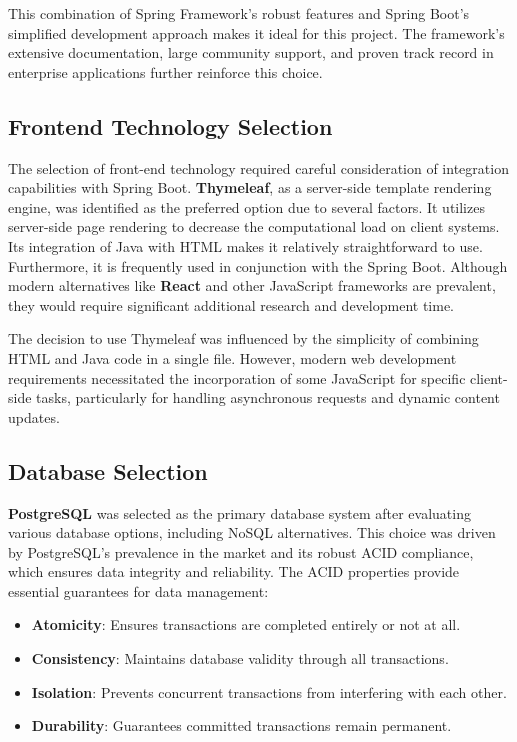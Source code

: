 This combination of Spring Framework's robust features and Spring Boot's simplified development approach makes it ideal for this project.
The framework's extensive documentation, large community support, and proven track record in enterprise applications further reinforce this choice.

\subsection{Frontend Technology Selection}\label{subsec:frontend-selection}

The selection of front-end technology required careful consideration of integration capabilities with Spring Boot.
\textbf{Thymeleaf}, as a server-side template rendering engine, was identified as the preferred option due to several factors.
It utilizes server-side page rendering to decrease the computational load on client systems.
Its integration of Java with HTML makes it relatively straightforward to use.
Furthermore, it is frequently used in conjunction with the Spring Boot.
Although modern alternatives like \textbf{React} and other JavaScript frameworks are prevalent, they would require significant additional research and development time.

The decision to use Thymeleaf was influenced by the simplicity of combining HTML and Java code in a single file.
However, modern web development requirements necessitated the incorporation of some JavaScript for specific client-side tasks, particularly for handling asynchronous requests and dynamic content updates.

\subsection{Database Selection}\label{subsec:database-selection}

\textbf{PostgreSQL} was selected as the primary database system after evaluating various database options, including NoSQL alternatives.
This choice was driven by PostgreSQL's prevalence in the market and its robust ACID compliance, which ensures data integrity and reliability.
The ACID properties provide essential guarantees for data management:

\begin{itemize}
    \item \textbf{Atomicity}: Ensures transactions are completed entirely or not at all.
    \item \textbf{Consistency}: Maintains database validity through all transactions.
    \item \textbf{Isolation}: Prevents concurrent transactions from interfering with each other.
    \item \textbf{Durability}: Guarantees committed transactions remain permanent.
\end{itemize}

